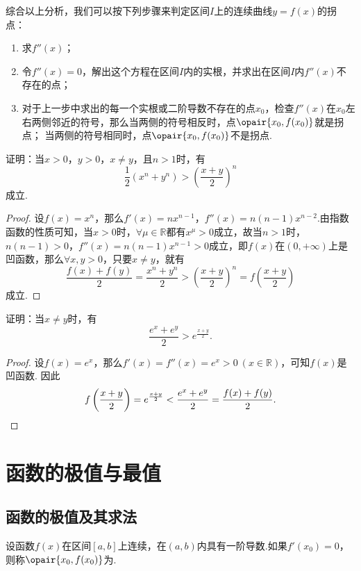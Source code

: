 {\color{red}综合以上分析，我们可以按下列步骤来判定区间\(I\)上的连续曲线\(y=f(x)\)的拐点：\begin{enumerate}
\item 求\(f''(x)\)；
\item 令\(f''(x) = 0\)，解出这个方程在区间\(I\)内的实根，并求出在区间\(I\)内\(f''(x)\)不存在的点；
\item 对于上一步中求出的每一个实根或二阶导数不存在的点\(x_0\)，检查\(f''(x)\)在\(x_0\)左右两侧邻近的符号，那么当两侧的符号相反时，点\(\opair{x_0,f(x_0)}\)就是拐点；
当两侧的符号相同时，点\(\opair{x_0,f(x_0)}\)不是拐点.
\end{enumerate}}

\begin{example}
证明：当\(x>0\)，\(y>0\)，\(x \neq y\)，且\(n>1\)时，有\begin{equation}\label{equation:微分中值定理.平均数的比较1}
\frac{1}{2} (x^n+y^n) > \left(\frac{x+y}{2}\right)^n
\end{equation}成立.
\begin{proof}
设\(f(x) = x^n\)，那么\(f'(x) = n x^{n-1}\)，\(f''(x) = n(n-1) x^{n-2}\).由指数函数的性质可知，当\(x > 0\)时，\(\forall \mu \in \mathbb{R}\)都有\(x^{\mu} > 0\)成立，故当\(n > 1\)时，\(n(n-1)>0\)，\(f''(x) = n(n-1) x^{n-1} > 0\)成立，即\(f(x)\)在\((0,+\infty)\)上是凹函数，那么\(\forall x,y>0\)，只要\(x \neq y\)，就有\[
\frac{f(x)+f(y)}{2} = \frac{x^n+y^n}{2} > \left(\frac{x+y}{2}\right)^n = f\left(\frac{x+y}{2}\right)
\]成立.
\end{proof}
\end{example}

\begin{example}
证明：当\(x \neq y\)时，有\begin{equation}
\frac{e^x + e^y}{2} > e^{\frac{x+y}{2}}.
\end{equation}
\begin{proof}
设\(f(x) = e^x\)，那么\(f'(x) = f''(x) = e^x > 0\ (x\in\mathbb{R})\)，可知\(f(x)\)是凹函数.
因此\[
f\left(\frac{x+y}{2}\right) = e^{\frac{x+y}{2}}
< \frac{e^x+e^y}{2} = \frac{f(x)+f(y)}{2}.
\qedhere
\]
\end{proof}
\end{example}

\section{函数的极值与最值}
\subsection{函数的极值及其求法}
\begin{definition}[驻点]
设函数\(f(x)\)在区间\([a,b]\)上连续，在\((a,b)\)内具有一阶导数.如果\(f'(x_0)=0\)，则称\(\opair{x_0,f(x_0)}\)为.
\end{definition}

